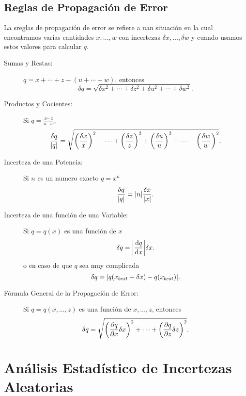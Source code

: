 \subsection{Reglas de Propagación de Error}
La sreglas de propagación de error se refiere a uan situación en la cual encontramos varias cantidades $x,\ldots,w$ con incertezas $\delta x, \ldots ,\delta w$ y cuando usamos estos valores para calcular $q$. 
\begin{tcolorbox}
	\begin{description}
		\item[Sumas y Restas: ] $q = x + \cdots + z - (u + \cdots + w)$, entonces
			\begin{equation}
				\delta q = \sqrt{\delta x ^2 + \cdots + \delta z ^2 + \delta u ^2 + \cdots + \delta w^2}.
			\end{equation}
		\item[Productos y Cocientes: ] Si $q = \frac{x\cdots z}{u \cdots w},$
			\begin{equation}
				\frac{\delta q}{\abs{q}} = \sqrt{\qty(\frac{\delta x}{x})^2 + \cdots + \qty(\frac{\delta z}{z})^2 + \qty(\frac{\delta u}{u})^2 + \cdots + \qty(\frac{\delta w}{w})^2}.
			\end{equation}
		\item[Incerteza de una Potencia: ] Si $n$ es un numero exacto $q = x^n$
			\begin{equation}
				\frac{\delta q}{\abs{q}} = \abs{n} \frac{\delta x}{\abs{x}}.
			\end{equation}
		\item[Incerteza de una función de una Variable: ] Si $q = q(x)$ es una función de $x$
			\begin{equation}
				\delta q = \abs{\dv{q}{x}} \delta x.
			\end{equation}
		o en caso de que $q$ sea muy complicada
			\begin{equation}
				\delta q = \abs{q(x_{best} + \delta x) - q(x_{best})}.
			\end{equation}
		\item[Fórmula General de la Propagación de Error: ] Si $q = q(x,\ldots ,z)$ es una función de $x,\ldots ,z$, entonces
			\begin{equation}
				\delta q = \sqrt{\qty(\pdv{q}{x} \delta x)^2 + \cdots + \qty(\pdv{q}{z} \delta z)^2}.
			\end{equation}
	\end{description}
\end{tcolorbox}


\section{Análisis Estadístico de Incertezas Aleatorias}
